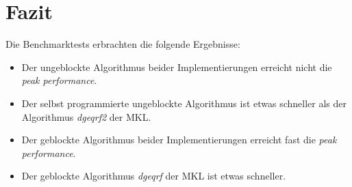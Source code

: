 \newpage
\section{Fazit}
Die Benchmarktests erbrachten die folgende Ergebnisse:
\begin{itemize}
	\item Der ungeblockte Algorithmus beider Implementierungen erreicht nicht die \textit{peak performance}.
	\item Der selbst programmierte ungeblockte Algorithmus ist etwas schneller als der Algorithmus \textit{dgeqrf2} der MKL.
	\item Der geblockte Algorithmus beider Implementierungen erreicht fast die \textit{peak performance}.
	\item Der geblockte Algorithmus \textit{dgeqrf} der MKL ist etwas schneller.
\end{itemize}










   
